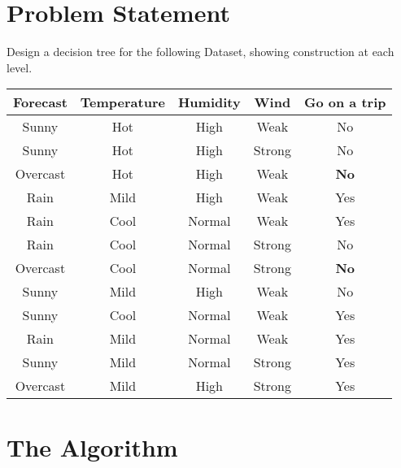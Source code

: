 \documentclass[11pt]{article}
\begin{document}
	\section{Problem Statement}
	Design a decision tree for the following Dataset, showing construction at each level. 
	\begin{table}[!ht]
		\centering
		\begin{tabular}{|c|c|c|c|c|}
			\hline
			\textbf{Forecast} & \textbf{Temperature} & \textbf{Humidity} & \textbf{Wind} & \textbf{Go on a trip}  \\ \hline
			Sunny             & Hot                  & High              & Weak          & No                    \\ \hline
			Sunny             & Hot                  & High              & Strong        & No                    \\ \hline
			Overcast          & Hot                  & High              & Weak          & \textbf{No}                   \\ \hline
			Rain              & Mild                 & High              & Weak          & Yes                   \\ \hline
			Rain              & Cool                 & Normal            & Weak          & Yes                   \\ \hline
			Rain              & Cool                 & Normal            & Strong        & No                    \\ \hline
			Overcast          & Cool                 & Normal            & Strong        & \textbf{No}                   \\ \hline
			Sunny             & Mild                 & High              & Weak          & No                    \\ \hline
			Sunny             & Cool                 & Normal            & Weak          & Yes                   \\ \hline
			Rain              & Mild                 & Normal            & Weak          & Yes                   \\ \hline
			Sunny             & Mild                 & Normal            & Strong        & Yes                   \\ \hline
			Overcast          & Mild                 & High              & Strong        & Yes                   \\ \hline
		\end{tabular}
	\end{table}
	\section{The Algorithm}
\end{document}

